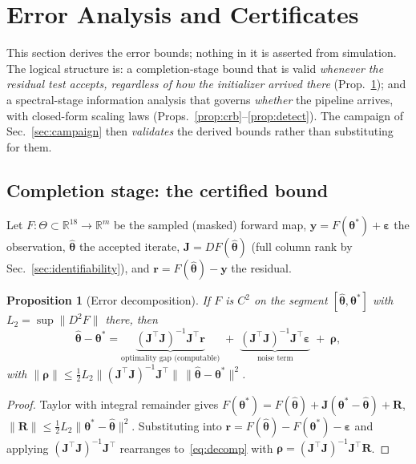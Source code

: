 \documentclass[twocolumn,preprintnumbers,amsmath,amssymb,pra,floatfix]{revtex4-2}
\newcommand{\vect}[1]{\bm{#1}}
\newtheorem{proposition}{Proposition}
\begin{document}
\section{Error Analysis and Certificates}
\label{sec:certify}

This section derives the error bounds; nothing in it is asserted from
simulation.  The logical structure is: a completion-stage bound that is
valid \emph{whenever the residual test accepts, regardless of how the
initializer arrived there} (Prop.~\ref{prop:decomp}); and a
spectral-stage information analysis that governs \emph{whether} the
pipeline arrives, with closed-form scaling laws
(Props.~\ref{prop:crb}--\ref{prop:detect}).  The campaign of
Sec.~\ref{sec:campaign} then \emph{validates} the derived bounds rather
than substituting for them.

\subsection{Completion stage: the certified bound}

Let $F:\Theta\subset\mathbb{R}^{18}\to\mathbb{R}^{m}$ be the sampled
(masked) forward map, $\vect{y}=F(\vect{\theta}^{*})+\vect{\varepsilon}$
the observation, $\hat{\vect{\theta}}$ the accepted iterate,
$\vect{J}=DF(\hat{\vect{\theta}})$ (full column rank by
Sec.~\ref{sec:identifiability}), and
$\vect{r}=F(\hat{\vect{\theta}})-\vect{y}$ the residual.

\begin{proposition}[Error decomposition]
\label{prop:decomp}
If $F$ is $C^{2}$ on the segment
$[\hat{\vect{\theta}},\vect{\theta}^{*}]$ with
$L_{2}=\sup\lVert D^{2}F\rVert$ there, then
\begin{equation}
  \hat{\vect{\theta}}-\vect{\theta}^{*}
  = \underbrace{(\vect{J}^{\top}\vect{J})^{-1}\vect{J}^{\top}
    \vect{r}}_{\text{optimality gap (computable)}}
  \;+\; \underbrace{(\vect{J}^{\top}\vect{J})^{-1}\vect{J}^{\top}
    \vect{\varepsilon}}_{\text{noise term}}
  \;+\;\vect{\rho},
  \label{eq:decomp}
\end{equation}
with $\lVert\vect{\rho}\rVert\le\tfrac12 L_{2}
\lVert(\vect{J}^{\top}\vect{J})^{-1}\vect{J}^{\top}\rVert\,
\lVert\hat{\vect{\theta}}-\vect{\theta}^{*}\rVert^{2}$.
\end{proposition}
\begin{proof}
Taylor with integral remainder gives
$F(\vect{\theta}^{*})=F(\hat{\vect{\theta}})
+\vect{J}(\vect{\theta}^{*}-\hat{\vect{\theta}})+\vect{R}$,
$\lVert\vect{R}\rVert\le\tfrac12 L_{2}
\lVert\vect{\theta}^{*}-\hat{\vect{\theta}}\rVert^{2}$.  Substituting
into $\vect{r}=F(\hat{\vect{\theta}})-F(\vect{\theta}^{*})
-\vect{\varepsilon}$ and applying
$(\vect{J}^{\top}\vect{J})^{-1}\vect{J}^{\top}$ rearranges
to~\eqref{eq:decomp} with
$\vect{\rho}=(\vect{J}^{\top}\vect{J})^{-1}\vect{J}^{\top}
\vect{R}$.
\end{proof}
\end{document}
